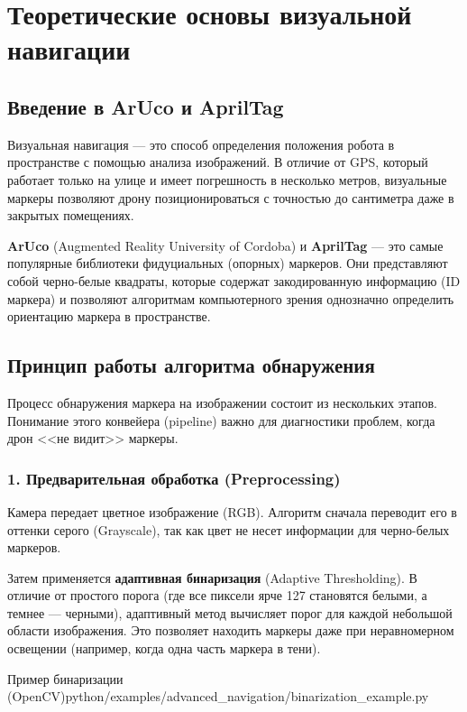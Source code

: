 \section{Теоретические основы визуальной навигации}

\subsection{Введение в ArUco и AprilTag}
Визуальная навигация — это способ определения положения робота в пространстве с помощью анализа изображений. В отличие от GPS, который работает только на улице и имеет погрешность в несколько метров, визуальные маркеры позволяют дрону позиционироваться с точностью до сантиметра даже в закрытых помещениях.

\textbf{ArUco} (Augmented Reality University of Cordoba) и \textbf{AprilTag} — это самые популярные библиотеки фидуциальных (опорных) маркеров. Они представляют собой черно-белые квадраты, которые содержат закодированную информацию (ID маркера) и позволяют алгоритмам компьютерного зрения однозначно определить ориентацию маркера в пространстве.

\subsection{Принцип работы алгоритма обнаружения}
Процесс обнаружения маркера на изображении состоит из нескольких этапов. Понимание этого конвейера (pipeline) важно для диагностики проблем, когда дрон <<не видит>> маркеры.

\subsubsection{1. Предварительная обработка (Preprocessing)}
Камера передает цветное изображение (RGB). Алгоритм сначала переводит его в оттенки серого (Grayscale), так как цвет не несет информации для черно-белых маркеров.

Затем применяется \textbf{адаптивная бинаризация} (Adaptive Thresholding). В отличие от простого порога (где все пиксели ярче 127 становятся белыми, а темнее — черными), адаптивный метод вычисляет порог для каждой небольшой области изображения. Это позволяет находить маркеры даже при неравномерном освещении (например, когда одна часть маркера в тени).

\begin{codefiletitle}[python]{Пример бинаризации (OpenCV)}{python/examples/advanced_navigation/binarization_example.py}
\end{codefiletitle}

